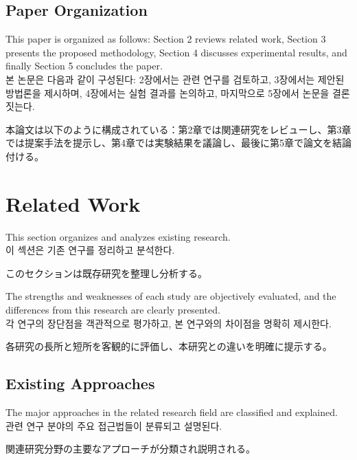 \documentclass[preprint,12pt]{elsarticle}
\begin{document}
\subsection{Paper Organization}
This paper is organized as follows: Section 2 reviews related work, Section 3 presents the proposed methodology, Section 4 discusses experimental results, and finally Section 5 concludes the paper. \\
본 논문은 다음과 같이 구성된다: 2장에서는 관련 연구를 검토하고, 3장에서는 제안된 방법론을 제시하며, 4장에서는 실험 결과를 논의하고, 마지막으로 5장에서 논문을 결론짓는다. \\
\begin{CJK}{UTF8}{min}
本論文は以下のように構成されている：第2章では関連研究をレビューし、第3章では提案手法を提示し、第4章では実験結果を議論し、最後に第5章で論文を結論付ける。
\end{CJK}

\section{Related Work}
\label{sec:related_work}

This section organizes and analyzes existing research. \\
이 섹션은 기존 연구를 정리하고 분석한다. \\
\begin{CJK}{UTF8}{min}
このセクションは既存研究を整理し分析する。
\end{CJK}

The strengths and weaknesses of each study are objectively evaluated, and the differences from this research are clearly presented. \\
각 연구의 장단점을 객관적으로 평가하고, 본 연구와의 차이점을 명확히 제시한다. \\
\begin{CJK}{UTF8}{min}
各研究の長所と短所を客観的に評価し、本研究との違いを明確に提示する。
\end{CJK}

\subsection{Existing Approaches}
The major approaches in the related research field are classified and explained. \\
관련 연구 분야의 주요 접근법들이 분류되고 설명된다. \\
\begin{CJK}{UTF8}{min}
関連研究分野の主要なアプローチが分類され説明される。
\end{CJK}
\end{document}
